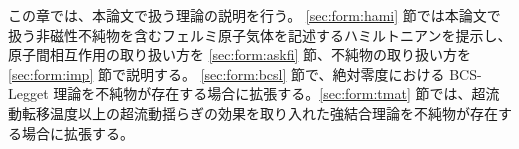 \label{chap:formalism}

この章では、本論文で扱う理論の説明を行う。
\ref{sec:form:hami} 節では本論文で扱う非磁性不純物を含むフェルミ原子気体を記述するハミルトニアンを提示し、原子間相互作用の取り扱い方を \ref{sec:form:askfi} 節、不純物の取り扱い方を \ref{sec:form:imp} 節で説明する。
\ref{sec:form:bcsl} 節で、絶対零度における BCS-Legget 理論を不純物が存在する場合に拡張する。\ref{sec:form:tmat} 節では、超流動転移温度以上の超流動揺らぎの効果を取り入れた強結合理論を不純物が存在する場合に拡張する。

\label{sec:form:hami}


\label{sec:form:bcsl}


\label{sec:form:tmat}

